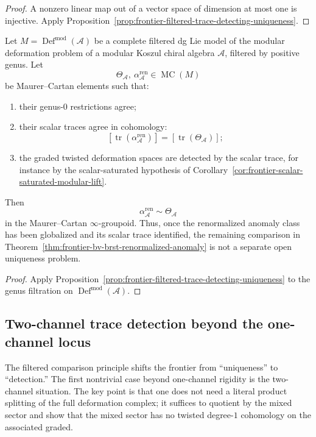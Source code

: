 \begin{proof}
A nonzero linear map out of a vector space of dimension at most one is
injective.
Apply
Proposition~\ref{prop:frontier-filtered-trace-detecting-uniqueness}.
\end{proof}

\begin{corollary}
\label{cor:frontier-bv-brst-comparison-from-trace-detection}
Let $M=\operatorname{Def}^{\mathrm{mod}}(\mathcal A)$ be a complete
filtered dg Lie model of the modular deformation problem of a modular
Koszul chiral algebra $\mathcal A$, filtered by positive genus.
Let
\[
\Theta_{\mathcal A},\ \alpha^{\mathrm{ren}}_{\mathcal A}
\in \operatorname{MC}(M)
\]
be Maurer--Cartan elements such that:
\begin{enumerate}[label=\textup{(\roman*)}]
\item their genus-$0$ restrictions agree;
\item their scalar traces agree in cohomology:
  \[
  [\operatorname{tr}(\alpha^{\mathrm{ren}}_{\mathcal A})]
  =
  [\operatorname{tr}(\Theta_{\mathcal A})];
  \]
\item the graded twisted deformation spaces are detected by the scalar
  trace, for instance by the scalar-saturated hypothesis of
  Corollary~\ref{cor:frontier-scalar-saturated-modular-lift}.
\end{enumerate}
Then
\[
\alpha^{\mathrm{ren}}_{\mathcal A}\sim \Theta_{\mathcal A}
\]
in the Maurer--Cartan $\infty$-groupoid.
Thus, once the renormalized anomaly class has been globalized and its
scalar trace identified, the remaining comparison in
Theorem~\ref{thm:frontier-bv-brst-renormalized-anomaly} is not a separate
open uniqueness problem.
\end{corollary}

\begin{proof}
Apply
Proposition~\ref{prop:frontier-filtered-trace-detecting-uniqueness} to the
genus filtration on $\operatorname{Def}^{\mathrm{mod}}(\mathcal A)$.
\end{proof}

\subsection{Two-channel trace detection beyond the one-channel locus}
\label{subsec:frontier-two-channel-trace-detection}

The filtered comparison principle shifts the frontier from ``uniqueness'' to
``detection.''
The first nontrivial case beyond one-channel rigidity is the two-channel
situation.  The key point is that one does not need a literal product
splitting of the full deformation complex; it suffices to quotient by the
mixed sector and show that the mixed sector has no twisted degree-$1$
cohomology on the associated graded.

